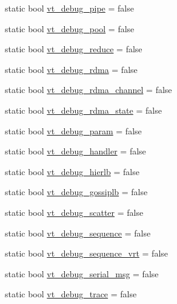 \begin{DoxyCompactItemize}
\item 
static bool \hyperlink{structvt_1_1arguments_1_1_arg_config_aba00af8a95c7fd6d41d08407a5fb33f1}{vt\+\_\+debug\+\_\+pipe} = false
\item 
static bool \hyperlink{structvt_1_1arguments_1_1_arg_config_a5fce7eff37704977022f2591d19471f8}{vt\+\_\+debug\+\_\+pool} = false
\item 
static bool \hyperlink{structvt_1_1arguments_1_1_arg_config_a6001b8760c0e1d53b0e55fc8c9de784e}{vt\+\_\+debug\+\_\+reduce} = false
\item 
static bool \hyperlink{structvt_1_1arguments_1_1_arg_config_a38e43be609c02e54398d44ceca1095fe}{vt\+\_\+debug\+\_\+rdma} = false
\item 
static bool \hyperlink{structvt_1_1arguments_1_1_arg_config_a78388ec62b79383eacf3e48b67a47a21}{vt\+\_\+debug\+\_\+rdma\+\_\+channel} = false
\item 
static bool \hyperlink{structvt_1_1arguments_1_1_arg_config_ade199a9171a20b108af3b3631f82e5d5}{vt\+\_\+debug\+\_\+rdma\+\_\+state} = false
\item 
static bool \hyperlink{structvt_1_1arguments_1_1_arg_config_a7a9c93ea8a341a22ff4d1e58c3543d17}{vt\+\_\+debug\+\_\+param} = false
\item 
static bool \hyperlink{structvt_1_1arguments_1_1_arg_config_aa2652f92547befd3f21fa9e7bf40bf94}{vt\+\_\+debug\+\_\+handler} = false
\item 
static bool \hyperlink{structvt_1_1arguments_1_1_arg_config_a427c7fec8f7075a40014f1e6e65f849b}{vt\+\_\+debug\+\_\+hierlb} = false
\item 
static bool \hyperlink{structvt_1_1arguments_1_1_arg_config_ad7a74adc5ab27891aee08a53e0bade6a}{vt\+\_\+debug\+\_\+gossiplb} = false
\item 
static bool \hyperlink{structvt_1_1arguments_1_1_arg_config_a7f07188c6e8a456e9bfdad9ced6159df}{vt\+\_\+debug\+\_\+scatter} = false
\item 
static bool \hyperlink{structvt_1_1arguments_1_1_arg_config_a871a494f26456713e0e3a2d66d9ed08d}{vt\+\_\+debug\+\_\+sequence} = false
\item 
static bool \hyperlink{structvt_1_1arguments_1_1_arg_config_a8d2ad7c39aea97ec9679b3b660d8c017}{vt\+\_\+debug\+\_\+sequence\+\_\+vrt} = false
\item 
static bool \hyperlink{structvt_1_1arguments_1_1_arg_config_a8823380fec70a43d1179bcbbef969b1f}{vt\+\_\+debug\+\_\+serial\+\_\+msg} = false
\item 
static bool \hyperlink{structvt_1_1arguments_1_1_arg_config_a526c1e1f5819dd2296fed29673a14fbe}{vt\+\_\+debug\+\_\+trace} = false

\end{DoxyCompactItemize}
